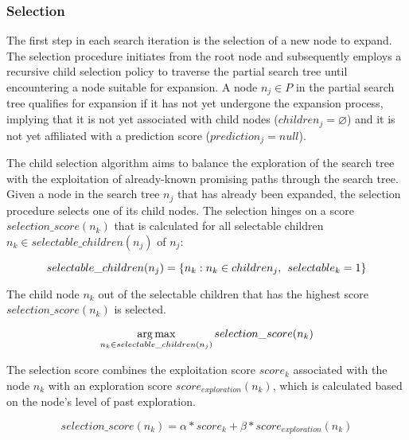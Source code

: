 \FloatBarrier
\subsubsection{Selection}
\label{s_Methodology_CoDy_Selection}
The first step in each search iteration is the selection of a new node to expand. The selection procedure initiates from the root node and subsequently employs a recursive child selection policy to traverse the partial search tree until encountering a node suitable for expansion. A node $n_j \in P$ in the partial search tree qualifies for expansion if it has not yet undergone the expansion process, implying that it is not yet associated with child nodes ($children_j = \varnothing$) and it is not yet affiliated with a prediction score ($prediction_j = null$).

The child selection algorithm aims to balance the exploration of the search tree with the exploitation of already-known promising paths through the search tree. Given a node in the search tree $n_j$ that has already been expanded, the selection procedure selects one of its child nodes. The selection hinges on a score $selection\_score(n_k)$ that is calculated for all selectable children $n_k \in selectable\_children(n_j)$ of $n_j$:

\begin{equation}
    selectable\_children(n_j) = \{n_k: n_k \in children_j, \hspace{1.5mm} selectable_k = 1\}
\end{equation}

The child node $n_k$ out of the selectable children that has the highest score $selection\_score(n_k)$ is selected.

\begin{equation}
    \operatorname*{arg\,max}_{n_k \in selectable\_children(n_j)} selection\_score(n_k)
\end{equation}

The selection score combines the exploitation score $score_k$ associated with the node $n_k$ with an exploration score $score_{exploration}(n_k)$, which is calculated based on the node's level of past exploration.

\begin{equation}
    selection\_score(n_k) = \alpha * score_k + \beta * score_{exploration}(n_k)
\end{equation}


